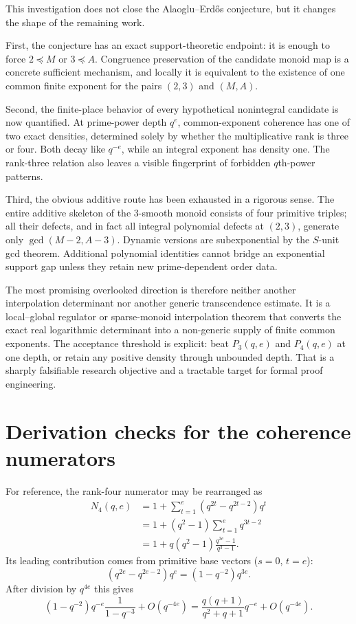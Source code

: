 \documentclass[11pt]{article}
\theoremstyle{definition}
\theoremstyle{remark}
\begin{document}
This investigation does not close the Alaoglu--Erd\H{o}s conjecture, but it changes the shape of
the remaining work.

First, the conjecture has an exact support-theoretic endpoint: it is enough to force
$2\preccurlyeq M$ or $3\preccurlyeq A$.  Congruence preservation of the candidate monoid map is
a concrete sufficient mechanism, and locally it is equivalent to the existence of one common
finite exponent for the pairs $(2,3)$ and $(M,A)$.

Second, the finite-place behavior of every hypothetical nonintegral candidate is now quantified.
At prime-power depth $q^e$, common-exponent coherence has one of two exact densities, determined
solely by whether the multiplicative rank is three or four.  Both decay like $q^{-e}$, while an
integral exponent has density one.  The rank-three relation also leaves a visible fingerprint of
forbidden $q$th-power patterns.

Third, the obvious additive route has been exhausted in a rigorous sense.  The entire additive
skeleton of the $3$-smooth monoid consists of four primitive triples; all their defects, and in
fact all integral polynomial defects at $(2,3)$, generate only
$\gcd(M-2,A-3)$.  Dynamic versions are subexponential by the $S$-unit gcd theorem.  Additional
polynomial identities cannot bridge an exponential support gap unless they retain new
prime-dependent order data.

The most promising overlooked direction is therefore neither another interpolation determinant
nor another generic transcendence estimate.  It is a local--global regulator or sparse-monoid
interpolation theorem that converts the exact real logarithmic determinant into a non-generic
supply of finite common exponents.  The acceptance threshold is explicit: beat
$P_3(q,e)$ and $P_4(q,e)$ at one depth, or retain any positive density through unbounded depth.
That is a sharply falsifiable research objective and a tractable target for formal proof
engineering.

\appendix

\section{Derivation checks for the coherence numerators}

For reference, the rank-four numerator may be rearranged as
\[
\begin{aligned}
 N_4(q,e)
 &=1+\sum_{t=1}^e(q^{2t}-q^{2t-2})q^t\\
 &=1+(q^2-1)\sum_{t=1}^e q^{3t-2}\\
 &=1+q(q^2-1)\frac{q^{3e}-1}{q^3-1}.
\end{aligned}
\]
Its leading contribution comes from primitive base vectors ($s=0$, $t=e$):
\[
       (q^{2e}-q^{2e-2})q^e
       =(1-q^{-2})q^{3e}.
\]
After division by $q^{4e}$ this gives
\[
  (1-q^{-2})q^{-e}
  \frac{1}{1-q^{-3}}+O(q^{-4e})
  =\frac{q(q+1)}{q^2+q+1}q^{-e}+O(q^{-4e}).
\]
\end{document}
